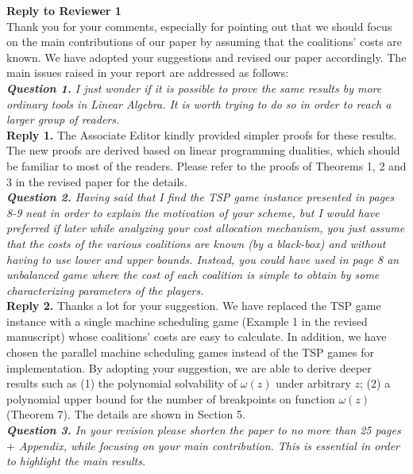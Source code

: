 \documentclass[11pt]{article}
\begin{document}
\newpage
\noindent \textbf{\large Reply to Reviewer 1}
\\[3mm]
Thank you for your comments, especially for pointing out that we should focus on the main contributions of our paper by assuming that the coalitions' costs are known. We have adopted your suggestions and revised our paper accordingly. The main issues raised in your report are addressed as follows:
\\[4mm]
%
%
%
%
\noindent \textit{\textbf{Question 1.} 
I just wonder if it is possible to prove the same results by more ordinary tools in Linear Algebra. It is worth trying to do so in order to reach a larger group of readers.}
\\[2mm]
\noindent \textbf{Reply 1.}
The Associate Editor kindly provided simpler proofs for these results.
The new proofs are derived based on linear programming dualities, which should be familiar to most of the readers.
Please refer to the proofs of Theorems 1, 2 and 3 in the revised paper for the details.
\\[4mm]
%
%
%
\noindent \textit{\textbf{Question 2.} 
Having said that I find the TSP game instance presented in
pages 8-9 neat in order to explain the motivation of your scheme, but I would have preferred if later while analyzing your cost allocation mechanism, you just assume that the costs of the various coalitions are known (by a black-box) and without having to use lower and upper bounds. Instead, you could have used in page 8 an unbalanced game where the cost of each coalition is simple to obtain by some characterizing parameters of the players.}
\\[2mm]
\noindent \textbf{Reply 2.}
Thanks a lot for your suggestion.
We have replaced the TSP game instance with a single machine scheduling game (Example 1 in the revised manuscript) whose coalitions' costs are easy to calculate.
In addition, we have chosen the parallel machine scheduling games instead of the TSP games for implementation.
By adopting your suggestion, we are able to derive  deeper results such as (1) the polynomial solvability of $\omega(z)$ under arbitrary $z$; (2) a polynomial upper bound for the number of breakpoints on function $\omega(z)$ (Theorem 7).
The details are shown in Section 5.
\\[4mm]
%
%
%
\noindent \textit{\textbf{Question 3.}
In your revision please shorten the paper to no more than 25 pages $+$ Appendix, while focusing on your main contribution. This is essential in order to highlight the main results.
}
\\[2mm]
\end{document}
